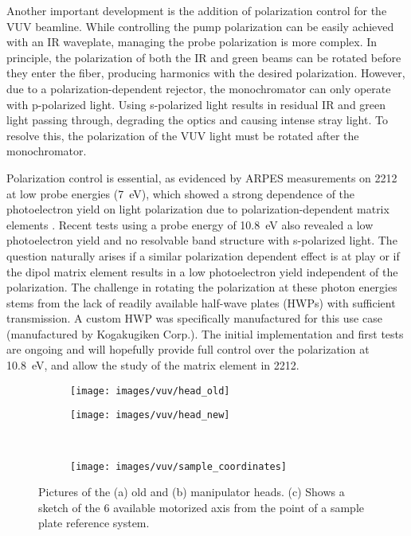 Another important development is the addition of polarization control for the VUV beamline.
While controlling the pump polarization can be easily achieved with an IR waveplate, managing the probe polarization is more complex.
In principle, the polarization of both the IR and green beams can be rotated before they enter the fiber, producing harmonics with the desired polarization.
However, due to a polarization-dependent rejector, the monochromator can only operate with p-polarized light.
Using s-polarized light results in residual IR and green light passing through, degrading the optics and causing intense stray light.
To resolve this, the polarization of the VUV light must be rotated after the monochromator.

Polarization control is essential, as evidenced by ARPES measurements on 2212 at low probe energies (\qty{7}{\electronvolt}), which showed a strong dependence of the photoelectron yield on light polarization due to polarization-dependent matrix elements \cite{fanciulli_spin_2018}.
Recent tests using a probe energy of \qty{10.8}{\electronvolt} also revealed a low photoelectron yield and no resolvable band structure with s-polarized light.
The question naturally arises if a similar polarization dependent effect is at play or if the dipol matrix element results in a low photoelectron yield independent of the polarization.
The challenge in rotating the polarization at these photon energies stems from the lack of readily available half-wave plates (HWPs) with sufficient transmission.
A custom HWP was specifically manufactured for this use case (manufactured by Kogakugiken Corp.).
The initial implementation and first tests are ongoing and will hopefully provide full control over the polarization at \qty{10.8}{\electronvolt}, and allow the study of the matrix element in 2212.

\begin{figure}[t]
	\centering
	\begin{subfigure}[b]{0.45\textwidth}
		\texttt{[image: images/vuv/head\_old]}
		\caption{}
	\end{subfigure}
	\begin{subfigure}[b]{0.45\textwidth}
		\texttt{[image: images/vuv/head\_new]}
		\caption{}
	\end{subfigure}
	\\
	\begin{subfigure}[b]{0.45\textwidth}
		\texttt{[image: images/vuv/sample\_coordinates]}
		\caption{}
	\end{subfigure}
	\caption{Pictures of the (a) old and (b) manipulator heads. (c) Shows a sketch of the 6 available motorized axis from the point of a sample plate reference system.}
	\label{fig:manip_head}
\end{figure}

